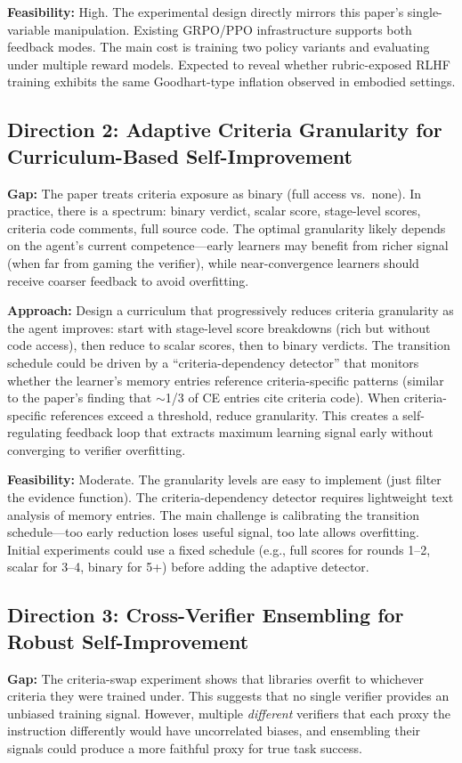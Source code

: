 \documentclass[11pt,a4paper]{article}
\begin{document}
\textbf{Feasibility:} High. The experimental design directly mirrors this paper's single-variable manipulation. Existing GRPO/PPO infrastructure supports both feedback modes. The main cost is training two policy variants and evaluating under multiple reward models. Expected to reveal whether rubric-exposed RLHF training exhibits the same Goodhart-type inflation observed in embodied settings.

\subsection{Direction 2: Adaptive Criteria Granularity for Curriculum-Based Self-Improvement}
\textbf{Gap:} The paper treats criteria exposure as binary (full access vs.\ none). In practice, there is a spectrum: binary verdict, scalar score, stage-level scores, criteria code comments, full source code. The optimal granularity likely depends on the agent's current competence---early learners may benefit from richer signal (when far from gaming the verifier), while near-convergence learners should receive coarser feedback to avoid overfitting.

\textbf{Approach:} Design a curriculum that progressively reduces criteria granularity as the agent improves: start with stage-level score breakdowns (rich but without code access), then reduce to scalar scores, then to binary verdicts. The transition schedule could be driven by a ``criteria-dependency detector'' that monitors whether the learner's memory entries reference criteria-specific patterns (similar to the paper's finding that $\sim$1/3 of CE entries cite criteria code). When criteria-specific references exceed a threshold, reduce granularity. This creates a self-regulating feedback loop that extracts maximum learning signal early without converging to verifier overfitting.

\textbf{Feasibility:} Moderate. The granularity levels are easy to implement (just filter the evidence function). The criteria-dependency detector requires lightweight text analysis of memory entries. The main challenge is calibrating the transition schedule---too early reduction loses useful signal, too late allows overfitting. Initial experiments could use a fixed schedule (e.g., full scores for rounds 1--2, scalar for 3--4, binary for 5+) before adding the adaptive detector.

\subsection{Direction 3: Cross-Verifier Ensembling for Robust Self-Improvement}
\textbf{Gap:} The criteria-swap experiment shows that libraries overfit to whichever criteria they were trained under. This suggests that no single verifier provides an unbiased training signal. However, multiple \emph{different} verifiers that each proxy the instruction differently would have uncorrelated biases, and ensembling their signals could produce a more faithful proxy for true task success.
\end{document}
